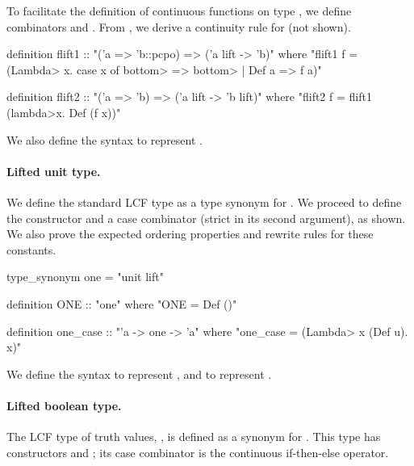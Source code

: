 \noindent
To facilitate the definition of continuous functions on type , we define combinators  and . From , we derive a continuity rule for  (not shown).
\begin{isacode}
definition flift1 :: "('a => 'b::pcpo) => ('a lift -> 'b)"
  where "flift1 f = (\<Lambda> x. case x of \<bottom> => \<bottom> | Def a => f a)"
\end{isacode}
\unmedskip
{}
\begin{isacode}
definition flift2 :: "('a => 'b) => ('a lift -> 'b lift)"
  where "flift2 f = flift1 (\<lambda>x. Def (f x))"
\end{isacode}
We also define the syntax  to represent .

\paragraph{Lifted unit type.} We define the standard LCF type  as a type synonym for . We proceed to define the constructor  and a case combinator  (strict in its second argument), as shown. We also prove the expected ordering properties and rewrite rules for these constants.

\begin{isacode}
type_synonym one = "unit lift"
\end{isacode}
\unmedskip
{}
\begin{isacode}
definition ONE :: "one"
  where "ONE = Def ()"
\end{isacode}
\unmedskip
{}
\begin{isacode}
definition one_case :: "'a -> one -> 'a"
  where "one_case = (\<Lambda> x (Def u). x)"
\end{isacode}

\noindent
We define the syntax  to represent , and  to represent .

\paragraph{Lifted boolean type.} The LCF type of truth values, , is defined as a synonym for . This type has constructors  and ; its case combinator  is the continuous if-then-else operator.

